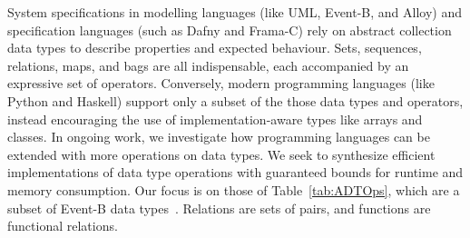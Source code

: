 \documentclass[runningheads]{llncs}
\begin{document}
System specifications in modelling languages (like UML, Event-B, and Alloy) and specification languages (such as Dafny and Frama-C) rely on abstract collection data types to describe properties and expected behaviour. Sets, sequences, relations, maps, and bags are all indispensable, each accompanied by an expressive set of operators. %
Conversely, modern programming languages (like Python and Haskell) support only a subset of the those data types and operators, instead encouraging the use of implementation-aware types like arrays and classes.
In ongoing work, we investigate how programming languages can be extended with more operations on data types. We seek to synthesize efficient implementations of data type operations with guaranteed bounds for runtime and memory consumption.
Our focus is on those of Table~\ref{tab:ADTOps}, which are a subset of Event-B data types~\cite{abrial2010modeling}. Relations are sets of pairs, and functions are functional relations.
\end{document}
